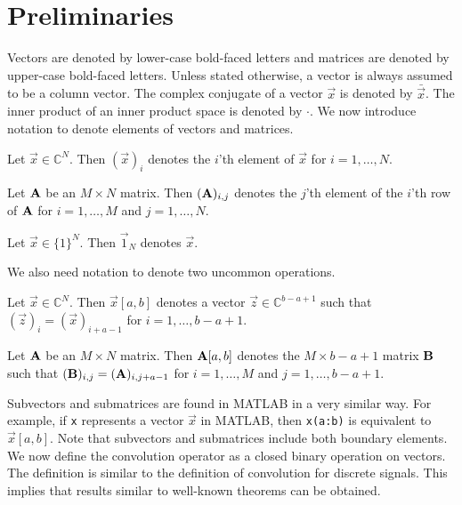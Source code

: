 \documentclass[a4paper, openany, oneside]{memoir}
\begin{document}
\section{Preliminaries}
\label{sec:reconstruction-preliminaries}

Vectors are denoted by lower-case bold-faced letters and matrices are denoted by upper-case bold-faced letters. Unless stated otherwise, a vector is always assumed to be a column vector. The complex conjugate of a vector $\vec{x}$ is denoted by $\bar{\vec{x}}$. The inner product of an inner product space is denoted by $\cdot$. We now introduce notation to denote elements of vectors and matrices.

\begin{blockDefinition}
    Let $\vec{x} \in \mathbb{C}^N$. Then $(\vec{x})_i$ denotes the $i$'th element of $\vec{x}$ for $i = 1,\ldots,N$.
\end{blockDefinition}

\begin{blockDefinition}
    Let $\boldsymbol{\mathbf{A}}$ be an $M \times N$ matrix. Then $(\boldsymbol{\mathbf{A}})_{i,j}$ denotes the $j$'th element of the $i$'th row of $\boldsymbol{\mathbf{A}}$ for $i = 1,\ldots,M$ and $j=1,\ldots,N$.
\end{blockDefinition}

\begin{blockDefinition}
    Let $\vec{x} \in \{1\}^N$. Then $\vec{1}_N$ denotes $\vec{x}$.
\end{blockDefinition}

We also need notation to denote two uncommon operations.

\begin{blockDefinition}[Subvector]
    Let $\vec{x} \in \mathbb{C}^N$. Then $\vec{x}[a,b]$ denotes a vector $\vec{z} \in \mathbb{C}^{b-a+1}$ such that $(\vec{z})_i = (\vec{x})_{i+a-1}$ for $i = 1,\ldots,b-a+1$.
\end{blockDefinition}

\begin{blockDefinition}[Submatrix]
    Let $\boldsymbol{\mathbf{A}}$ be an $M \times N$ matrix. Then $\boldsymbol{\mathbf{A}}[a,b]$ denotes the $M \times b-a+1$ matrix $\boldsymbol{\mathbf{B}}$ such that $(\boldsymbol{\mathbf{B}})_{i,j}=(\boldsymbol{\mathbf{A}})_{i,j+a-1}$ for $i = 1,\ldots,M$ and $j = 1,\ldots,b-a+1$.
\end{blockDefinition}

Subvectors and submatrices are found in MATLAB in a very similar way. For example, if \texttt{x} represents a vector $\vec{x}$ in MATLAB, then \texttt{x(a:b)} is equivalent to $\vec{x}[a,b]$. Note that subvectors and submatrices include both boundary elements.
We now define the convolution operator as a closed binary operation on vectors. The definition is similar to the definition of convolution for discrete signals. This implies that results similar to well-known theorems can be obtained.
\end{document}
